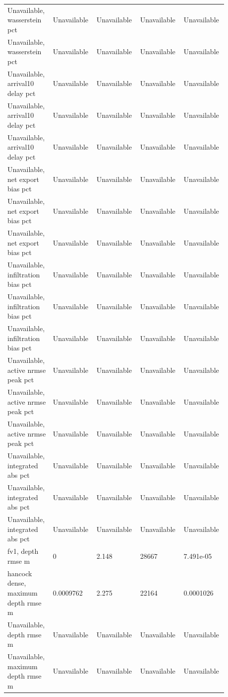 \begin{longtable}{p{0.1760\linewidth}p{0.1760\linewidth}p{0.1760\linewidth}p{0.1760\linewidth}p{0.1760\linewidth}}
Unavailable, wasserstein pct & Unavailable & Unavailable & Unavailable & Unavailable \\
Unavailable, wasserstein pct & Unavailable & Unavailable & Unavailable & Unavailable \\
Unavailable, arrival10 delay pct & Unavailable & Unavailable & Unavailable & Unavailable \\
Unavailable, arrival10 delay pct & Unavailable & Unavailable & Unavailable & Unavailable \\
Unavailable, arrival10 delay pct & Unavailable & Unavailable & Unavailable & Unavailable \\
Unavailable, net export bias pct & Unavailable & Unavailable & Unavailable & Unavailable \\
Unavailable, net export bias pct & Unavailable & Unavailable & Unavailable & Unavailable \\
Unavailable, net export bias pct & Unavailable & Unavailable & Unavailable & Unavailable \\
Unavailable, infiltration bias pct & Unavailable & Unavailable & Unavailable & Unavailable \\
Unavailable, infiltration bias pct & Unavailable & Unavailable & Unavailable & Unavailable \\
Unavailable, infiltration bias pct & Unavailable & Unavailable & Unavailable & Unavailable \\
Unavailable, active nrmse peak pct & Unavailable & Unavailable & Unavailable & Unavailable \\
Unavailable, active nrmse peak pct & Unavailable & Unavailable & Unavailable & Unavailable \\
Unavailable, active nrmse peak pct & Unavailable & Unavailable & Unavailable & Unavailable \\
Unavailable, integrated abs pct & Unavailable & Unavailable & Unavailable & Unavailable \\
Unavailable, integrated abs pct & Unavailable & Unavailable & Unavailable & Unavailable \\
Unavailable, integrated abs pct & Unavailable & Unavailable & Unavailable & Unavailable \\
fv1, depth rmse m & 0 & 2.148 & 28667 & 7.491e-05 \\
hancock dense, maximum depth rmse m & 0.0009762 & 2.275 & 22164 & 0.0001026 \\
Unavailable, depth rmse m & Unavailable & Unavailable & Unavailable & Unavailable \\
Unavailable, maximum depth rmse m & Unavailable & Unavailable & Unavailable & Unavailable \\

\end{longtable}
